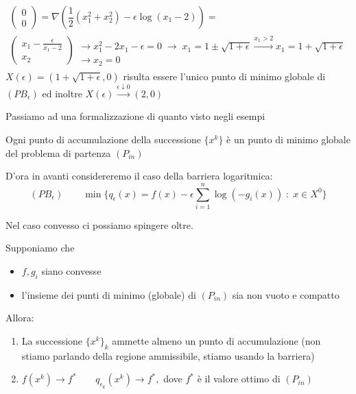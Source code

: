 \begin{example}
$$
\begin{array}{l}
\begin{pmatrix}
0 \\
0
\end{pmatrix}
=
\nabla (\dfrac{1}{2}(x_1^{2} + x_2^{2}) - \epsilon \log(x_1 -2)) = \\
\begin{pmatrix}
  x_1 - \frac{\epsilon}{x_1 -2} \\
 x_2
\end{pmatrix}
\begin{array}{ll}
 \rightarrow x_1^{2} - 2 x_1 - \epsilon =0 \;  \rightarrow \;
x_1 = 1 \pm \sqrt{1+ \epsilon} \xrightarrow{x_1 > 2}
x_1 = 1 + \sqrt{1+ \epsilon}
  \\
 \rightarrow  x_2=0
\end{array}
\end{array}
$$
$X(\epsilon) = (1 + \sqrt{1 + \epsilon},0)$ risulta 
essere l'unico punto di minimo globale di $(PB_{\epsilon})$
ed inoltre $X(\epsilon) \xrightarrow{\epsilon \downarrow 0}(2,0)$
\end{example}
Passiamo ad una formalizzazione di quanto visto negli esempi

\begin{theo}
Ogni punto di accumulazione della successione $\{x^{k}\}$
\`e un punto di minimo globale del problema di partenza
$(P_{in})$
\end{theo}
D'ora in avanti considereremo il caso della barriera logaritmica:
$$ (PB_{\epsilon}) \qquad \min \{ q_\epsilon(x) = f(x) - \displaystyle \epsilon \sum_{i=1}^{n} \log(-g_i(x)) \; : \; x \in X^{0} \}$$

Nel caso convesso ci possiamo spingere oltre.
\begin{theo}
  Supponiamo che
  \begin{itemize}
  \item  $f, g_i$ siano convesse
    \item l'insieme dei punti di minimo (globale) di $(P_{in})$ sia
      non vuoto e compatto
  \end{itemize}
  Allora:
  \begin{enumerate}
  \item La successione $\{x^{k} \}_k$ ammette almeno un punto di accumulazione
    (non stiamo parlando della regione ammissibile, stiamo usando la
    barriera)
    \item
      $f(x^{k}) \rightarrow f^{*} \quad \text{} \quad q_{\epsilon_{k}}(x^{k})\rightarrow f^{*}, $  dove $f^{*}$ \`e il valore ottimo di $(P_{in}) $
  \end{enumerate}
\end{theo}

